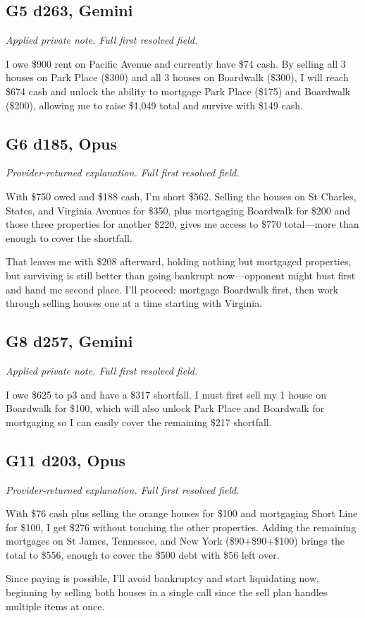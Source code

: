 \subsection*{G5 d263, Gemini}
{\small\textit{Applied private note. Full first resolved field.}\par I owe \$900 rent on Pacific Avenue and currently have \$74 cash. By selling all 3 houses on Park Place (\$300) and all 3 houses on Boardwalk (\$300), I will reach \$674 cash and unlock the ability to mortgage Park Place (\$175) and Boardwalk (\$200), allowing me to raise \$1,049 total and survive with \$149 cash.\par}
\subsection*{G6 d185, Opus}
{\small\textit{Provider-returned explanation. Full first resolved field.}\par With \$750 owed and \$188 cash, I'm short \$562. Selling the houses on St Charles, States, and Virginia Avenues for \$350, plus mortgaging Boardwalk for \$200 and those three properties for another \$220, gives me access to \$770 total—more than enough to cover the shortfall.

That leaves me with \$208 afterward, holding nothing but mortgaged properties, but surviving is still better than going bankrupt now—opponent might bust first and hand me second place. I'll proceed: mortgage Boardwalk first, then work through selling houses one at a time starting with Virginia.\par}
\subsection*{G8 d257, Gemini}
{\small\textit{Applied private note. Full first resolved field.}\par I owe \$625 to p3 and have a \$317 shortfall. I must first sell my 1 house on Boardwalk for \$100, which will also unlock Park Place and Boardwalk for mortgaging so I can easily cover the remaining \$217 shortfall.\par}
\subsection*{G11 d203, Opus}
{\small\textit{Provider-returned explanation. Full first resolved field.}\par With \$76 cash plus selling the orange houses for \$100 and mortgaging Short Line for \$100, I get \$276 without touching the other properties. Adding the remaining mortgages on St James, Tennessee, and New York (\$90+\$90+\$100) brings the total to \$556, enough to cover the \$500 debt with \$56 left over.

Since paying is possible, I'll avoid bankruptcy and start liquidating now, beginning by selling both houses in a single call since the sell plan handles multiple items at once.\par}

